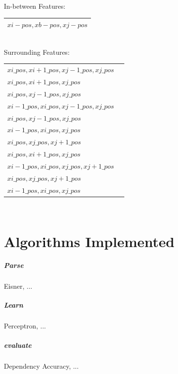 \documentclass[11pt]{article}
\begin{document}
In-between Features: \\

\begin{tabular}{|l|}
	\hline
		$xi-pos, xb-pos, xj-pos$ \\
	\hline
\end{tabular} \\



Surrounding Features: \\

\begin{tabular}{|l| p{10cm} |}
	\hline
		$xi\_pos, xi+1\_pos, xj-1\_pos, xj\_pos$ \\
		$xi\_pos, xi+1\_pos,          xj\_pos$ \\
		$xi\_pos,          xj-1\_pos, xj\_pos$ \\
		$xi-1\_pos, xi\_pos, xj-1\_pos, xj\_pos$ \\
		$         xi\_pos, xj-1\_pos, xj\_pos$ \\
		$xi-1\_pos, xi\_pos,          xj\_pos$ \\
		$xi\_pos,          xj\_pos, xj+1\_pos$ \\
		$xi\_pos, xi+1\_pos, xj\_pos         $ \\
		$xi-1\_pos, xi\_pos, xj\_pos, xj+1\_pos$ \\
		$         xi\_pos, xj\_pos, xj+1\_pos$ \\
		$xi-1\_pos, xi\_pos, xj\_pos         $ \\
	\hline
\end{tabular} \\
            


\section{Algorithms Implemented}

\subparagraph{Parse}
Eisner, ...

\subparagraph{Learn}
Perceptron, ...

\subparagraph{evaluate}
Dependency Accuracy, ...
\end{document}
